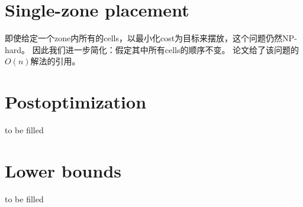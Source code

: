 \documentclass[UTF8,a4paper]{ctexart}
\begin{document}
\section{Single-zone placement}

即使给定一个zone内所有的cells，以最小化cost为目标来摆放，这个问题仍然NP-hard。
因此我们进一步简化：假定其中所有cells的顺序不变。
论文给了该问题的$O(n)$解法的引用。

\section{Postoptimization}

\begin{cautionblock}
    to be filled
\end{cautionblock}

\section{Lower bounds}

\begin{cautionblock}
    to be filled
\end{cautionblock}
\end{document}
